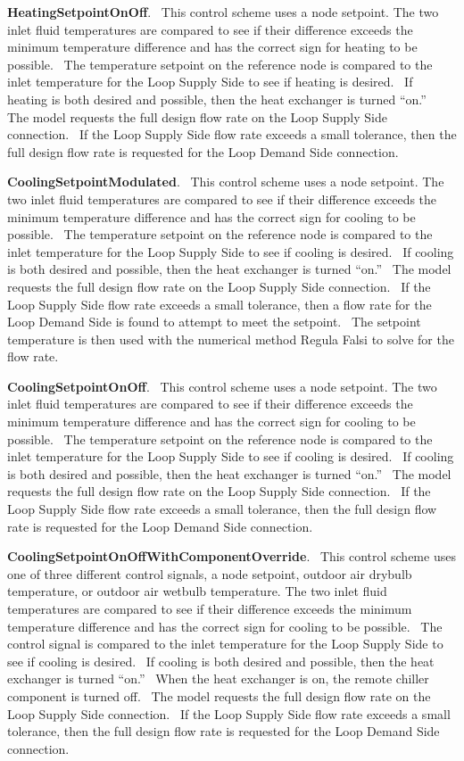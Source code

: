 \textbf{HeatingSetpointOnOff}.~ This control scheme uses a node setpoint. The two inlet fluid temperatures are compared to see if their difference exceeds the minimum temperature difference and has the correct sign for heating to be possible.~ The temperature setpoint on the reference node is compared to the inlet temperature for the Loop Supply Side to see if heating is desired.~ If heating is both desired and possible, then the heat exchanger is turned ``on.''~ The model requests the full design flow rate on the Loop Supply Side connection.~ If the Loop Supply Side flow rate exceeds a small tolerance, then the full design flow rate is requested for the Loop Demand Side connection.

\textbf{CoolingSetpointModulated}.~ This control scheme uses a node setpoint. The two inlet fluid temperatures are compared to see if their difference exceeds the minimum temperature difference and has the correct sign for cooling to be possible.~ The temperature setpoint on the reference node is compared to the inlet temperature for the Loop Supply Side to see if cooling is desired.~ If cooling is both desired and possible, then the heat exchanger is turned ``on.''~ The model requests the full design flow rate on the Loop Supply Side connection.~ If the Loop Supply Side flow rate exceeds a small tolerance, then a flow rate for the Loop Demand Side is found to attempt to meet the setpoint.~ The setpoint temperature is then used with the numerical method Regula Falsi to solve for the flow rate.

\textbf{CoolingSetpointOnOff}.~ This control scheme uses a node setpoint. The two inlet fluid temperatures are compared to see if their difference exceeds the minimum temperature difference and has the correct sign for cooling to be possible.~ The temperature setpoint on the reference node is compared to the inlet temperature for the Loop Supply Side to see if cooling is desired.~ If cooling is both desired and possible, then the heat exchanger is turned ``on.''~ The model requests the full design flow rate on the Loop Supply Side connection.~ If the Loop Supply Side flow rate exceeds a small tolerance, then the full design flow rate is requested for the Loop Demand Side connection.

\textbf{CoolingSetpointOnOffWithComponentOverride}.~ This control scheme uses one of three different control signals, a node setpoint, outdoor air drybulb temperature, or outdoor air wetbulb temperature. The two inlet fluid temperatures are compared to see if their difference exceeds the minimum temperature difference and has the correct sign for cooling to be possible.~ The control signal is compared to the inlet temperature for the Loop Supply Side to see if cooling is desired.~ If cooling is both desired and possible, then the heat exchanger is turned ``on.''~ When the heat exchanger is on, the remote chiller component is turned off.~ The model requests the full design flow rate on the Loop Supply Side connection.~ If the Loop Supply Side flow rate exceeds a small tolerance, then the full design flow rate is requested for the Loop Demand Side connection.

